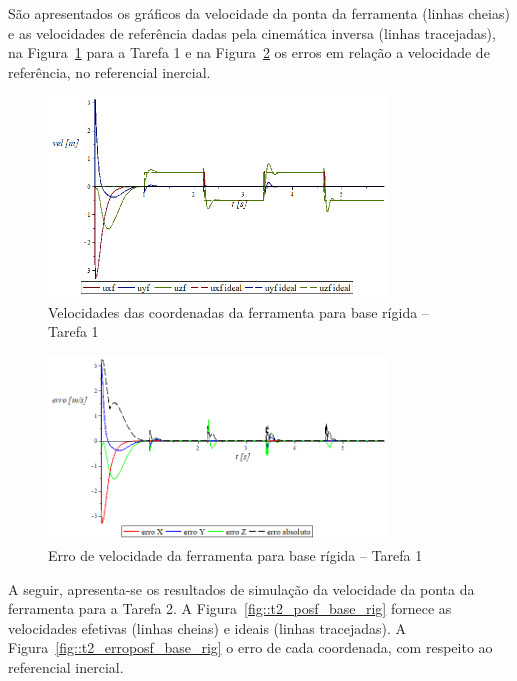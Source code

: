 São apresentados os gráficos da velocidade da ponta da ferramenta (linhas
cheias) e as velocidades de referência dadas pela cinemática inversa (linhas
tracejadas), na Figura~\ref{fig::t1_velf_base_rig} para a Tarefa 1 e na
Figura~\ref{fig::t1_errovelf_base_rig} os erros em relação a velocidade de
referência, no referencial inercial.

\begin{figure}[h!]
	\centering 
 	\includegraphics[width=0.80\textwidth]{figs/t1_velf_base_rig}
 	\caption{Velocidades das coordenadas da ferramenta para base rígida -- Tarefa 1}
 	\label{fig::t1_velf_base_rig}
\end{figure}

\begin{figure}[h!]
	\centering 
 	\includegraphics[width=0.80\textwidth]{figs/t1_errovelf_base_rig}
 	\caption{Erro de velocidade da ferramenta para base rígida --
 	Tarefa 1}
 	\label{fig::t1_errovelf_base_rig}
\end{figure}

A seguir, apresenta-se os resultados de simulação da velocidade da ponta da
ferramenta para a Tarefa 2.
A Figura~\ref{fig::t2_posf_base_rig} fornece as velocidades efetivas (linhas
cheias) e ideais (linhas tracejadas). A Figura~\ref{fig::t2_erroposf_base_rig} o
erro de cada coordenada, com respeito ao referencial inercial.

